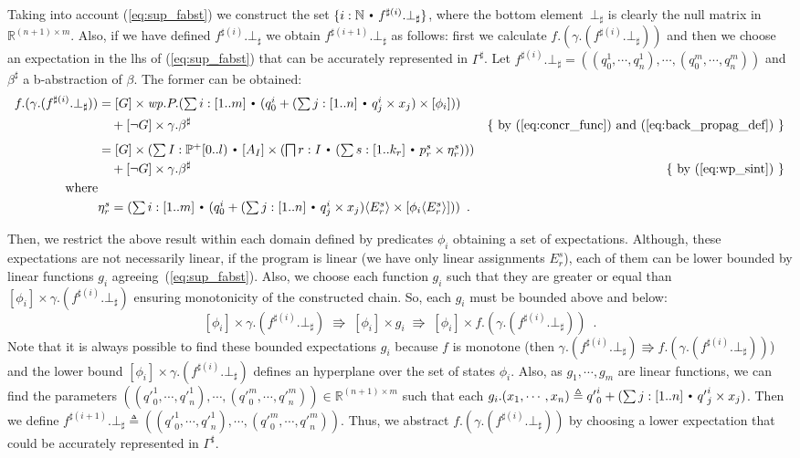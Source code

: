 \documentclass{eptcs}
\theoremstyle{plain}
\theoremstyle{definition}
\newcommand{\Nat}{\ensuremath{\mathbb N}}
\newcommand{\Real}{\ensuremath{\mathbb R}}
\newcommand{\lit}[1]{\ensuremath{\mathit{#1}}}
\newcommand{\Def}{\ensuremath{\triangleq}}
\newcommand{\Subst}[2][]
	{ \ensuremath{\ifthenelse{\equal{#1}{}}{\langle #2 \rangle}{\langle #1\mapsto #2 \rangle} }}
\newcommand{\dotsep}{\mbox{\raisebox{0.4ex}{\tiny\ensuremath{\:\;\bullet\;\:}}}}
\newcommand{\Not}{\ensuremath{\neg}}
\newcommand{\Wp}{\lit{wp}}
\newcommand{\elq}{\ensuremath{\Rrightarrow}}
\newcommand{\noi}[0]{\noindent}
\begin{document}
Taking into account (\ref{eq:sup_fabst}) we construct the set $\{i:\Nat \dotsep
f^{\sharp(i)}.\bot_\sharp\}$, where the bottom element~$\bot_\sharp$ is clearly the
null matrix in $\Real^{(n+1) \times m}$. Also, if we have defined
$f^{\sharp(i)}.\bot_\sharp$ we obtain $f^{\sharp(i+1)}.\bot_\sharp$ as
follows: first we calculate $f.(\gamma.(f^{\sharp(i)}.\bot_\sharp))$ and then we
choose an expectation in the lhs of (\ref{eq:sup_fabst}) that can be accurately
represented in $\Gamma^\sharp$. Let $f^{\sharp(i)}.\bot_\sharp =
((q_0^1,\cdots,q_n^1), \cdots, (q_0^m,\cdots,q_n^m))$ and $\beta^\sharp$ a
\mbox{b-abstraction} of $\beta$. The former can be obtained:
\begin{align*}
f.(\gamma.(f^{\sharp(i)}.\bot_\sharp)) 
  &= 
\textstyle
[G] \times
\Wp.P.
(\sum i : [1..m] \dotsep 
  (q_0^i + (\sum j : [1..n] \dotsep q_j^i \times x_j) \times [\phi_i]))
\\  &\quad + [\Not G] \times \gamma.\beta^\sharp
      & \mbox{\{ by (\ref{eq:concr_func}) and (\ref{eq:back_propag_def}) \}}
\\[1ex]
&=
\textstyle
[G] \times
( \sum I:\PowerNonEmpty[0..l) \dotsep
	[A_I] \times ( \bigsqcap r:I \dotsep
				( \sum s:[1..k_r] \dotsep p_r^s\times \eta_r^s)
			  )
)
\\ &\quad + [\Not G] \times \gamma.\beta^\sharp
      & \mbox{\{ by (\ref{eq:wp_sint}) \}}
\\
\text{where}
\\
&
\textstyle
\eta_r^s = 
(\sum i : [1..m] \dotsep 
  (q_0^i + (\sum j : [1..n] \dotsep q_j^i \times x_j)\Subst{E_r^s} \times [\phi_i\Subst{E_r^s}]))
\enspace.
\end{align*}

\noi Then, we restrict the above result within each domain defined by
predicates $\phi_i$ obtaining a set of expectations.
Although, these expectations are not necessarily linear, if the program is
linear (we have only linear assignments $E_r^s$), each of them can be
lower bounded by linear functions $g_i$ agreeing~(\ref{eq:sup_fabst}). Also,
we choose each function $g_i$ such that they are greater or equal than $[\phi_i]
\times\gamma.(f^{\sharp (i)}.\bot_\sharp)$ ensuring monotonicity of the
constructed chain. So, each $g_i$ must be bounded above and below:
\[
[\phi_i] \times \gamma.(f^{\sharp (i)}.\bot_\sharp) 
\;\elq\;
[\phi_i] \times g_i
\;\elq\; 
[\phi_i] \times f.(\gamma.(f^{\sharp(i)}.\bot_\sharp))\enspace.
\]
\sloppy Note that it is always possible to find these bounded expectations $g_i$ because
$f$ is monotone (then $\gamma.(f^{\sharp (i)}.\bot_\sharp) \elq
f.(\gamma.(f^{\sharp(i)}.\bot_\sharp))$) and the lower bound $[\phi_i] \times
\gamma.(f^{\sharp (i)}.\bot_\sharp)$ defines an hyperplane over the set of
states $\phi_i$. Also, as $g_1,\cdots,g_m$ are linear functions, we can find the parameters
\mbox{$(({q'}_0^1,\cdots,{q'}_n^1), \cdots, ({q'}_0^m,\cdots,{q'}_n^m)) \in
\Real^{(n+1)\times m}$} such that each $g_i.(x_1,\cdots,x_n) \Def {q'}_0^i + (\sum j
: [1..n] \dotsep {q'}_j^i \times x_j)$. Then we define
$f^{\sharp(i+1)}.\bot_\sharp \Def (({q'}_0^1,\cdots,{q'}_n^1), \cdots,
({q'}_0^m,\cdots,{q'}_n^m))$. Thus, we abstract
$f.(\gamma.(f^{\sharp(i)}.\bot_\sharp))$ by choosing a lower expectation that
could be accurately represented in $\Gamma^\sharp$.
\end{document}
